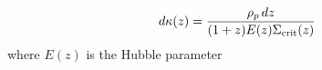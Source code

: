 \begin{equation}
d\kappa(z) = \frac{\rho_p\,dz}{(1+z) E(z) \Sigma_{\rm crit}(z)}
\label{eq:dkappa}
\end{equation}
where $E(z)$ is the Hubble parameter